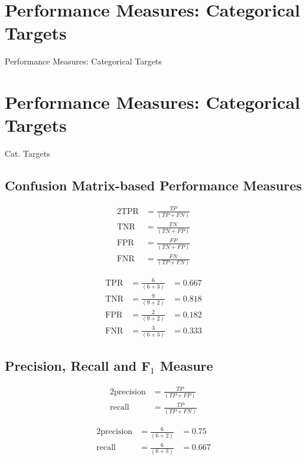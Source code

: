 \documentclass[xcolor={table}]{beamer}
\newcommand{\SectionSlideShortHeader}[3][]{
	\ifthenelse{\isempty{#1}}
		{\section[#3]{#2}\begin{frame} \begin{center}\begin{huge}#2\end{huge}\end{center}\end{frame}}
		{\section[#1]{#2}\begin{frame} \begin{center}\begin{huge}#3\end{huge}\end{center}\end{frame}}
}
\begin{document}
\SectionSlideShortHeader{Performance Measures: Categorical Targets}{Cat. Targets}

\subsection{Confusion Matrix-based Performance Measures}

 \begin{frame} 
\begin{alignat}{2}
\text{TPR} & = \frac{TP}{\left(TP + FN\right)} \label{eqn:tpr}\\
\text{TNR} & = \frac{TN}{\left(TN + FP\right)}  \label{eqn:tnr} \\
\text{FPR} & = \frac{FP}{\left(TN + FP\right)}  \label{eqn:fpr} \\
\text{FNR} & = \frac{FN}{\left(TP + FN\right)}  \label{eqn:fnr} 
\end{alignat}
\end{frame} 

 \begin{frame} 
\begin{eqnarray*}
\text{TPR} & = \frac{6}{\left(6 + 3\right)} & = 0.667 \\
\text{TNR} & = \frac{9}{\left(9 + 2\right)} & = 0.818 \\
 \text{FPR} & = \frac{2}{\left(9 + 2\right)} & = 0.182 \\
 \text{FNR} & = \frac{3}{\left(6 + 3\right)} & = 0.333 
\end{eqnarray*} 
\end{frame} 

\subsection{Precision, Recall and F$_1$ Measure}

 \begin{frame} 
\begin{alignat}{2}
\text{precision} & = \frac{TP}{\left(TP + FP\right)} \label{eqn:precision}\\
\text{recall} & = \frac{TP}{\left(TP + FN\right)}  \label{eqn:recall}
\end{alignat}
\end{frame} 

 \begin{frame} 
\begin{alignat*}{2}
\text{precision} & = \frac{6}{\left(6 + 2\right)} & = 0.75 \\
\text{recall} & = \frac{6}{\left(6 + 3\right)} & = 0.667
\end{alignat*}
\end{frame} 
\end{document}
